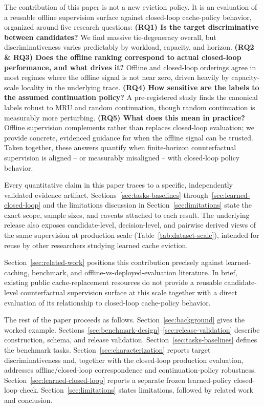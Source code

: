 \begin{sloppypar}
The contribution of this paper is not a new eviction policy. It is an
evaluation of a reusable offline supervision surface against closed-loop
cache-policy behavior, organized around five research questions:
\textbf{(RQ1) Is the target discriminative between candidates?} We find massive
tie-degeneracy overall, but discriminativeness varies predictably by workload,
capacity, and horizon.
\textbf{(RQ2 \& RQ3) Does the offline ranking correspond to actual closed-loop
performance, and what drives it?} Offline and closed-loop orderings agree in
most regimes where the offline signal is not near zero, driven heavily by
capacity-scale locality in the underlying trace.
\textbf{(RQ4) How sensitive are the labels to the assumed continuation policy?}
A pre-registered study finds the canonical labels robust to MRU and random
continuation, though random continuation is measurably more perturbing.
\textbf{(RQ5) What does this mean in practice?} Offline supervision complements
rather than replaces closed-loop evaluation; we provide concrete, evidenced
guidance for when the offline signal can be trusted. Taken together, these
answers quantify when finite-horizon counterfactual supervision is aligned
-- or measurably misaligned -- with closed-loop policy behavior.
\end{sloppypar}

Every quantitative claim in this paper traces to a specific, independently
validated evidence artifact. Sections~\ref{sec:tasks-baselines}
through~\ref{sec:learned-closed-loop} and the limitations discussion in
Section~\ref{sec:limitations} state the exact scope, sample sizes, and
caveats attached to each result. The underlying release also exposes candidate-level, decision-level,
and pairwise derived views of the same supervision at production scale
(Table~\ref{tab:dataset-scale}), intended for reuse by other researchers studying
learned cache eviction.

Section~\ref{sec:related-work} positions this contribution precisely
against learned-caching, benchmark, and offline-vs-deployed-evaluation
literature. In brief, existing public cache-replacement resources do not
provide a reusable candidate-level counterfactual supervision surface at
this scale together with a direct evaluation of its relationship to
closed-loop cache-policy behavior.

The rest of the paper proceeds as follows. Section~\ref{sec:background}
gives the worked example. Sections~\ref{sec:benchmark-design}--\ref{sec:release-validation}
describe construction, schema, and release validation. Section~\ref{sec:tasks-baselines}
defines the benchmark tasks. Section~\ref{sec:characterization}
reports target discriminativeness and, together with the closed-loop production evaluation,
addresses offline/closed-loop correspondence and continuation-policy robustness.
Section~\ref{sec:learned-closed-loop} reports a separate frozen learned-policy closed-loop
check. Section~\ref{sec:limitations} states limitations, followed by related work and conclusion.
